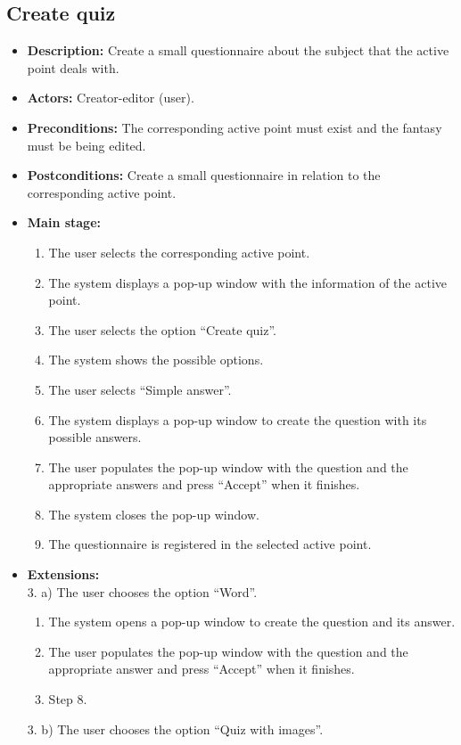 \subsection{Create quiz}
\begin{itemize}
	\item \textbf{Description:} Create a small questionnaire about the subject that the active point deals with.
	\item \textbf{Actors:} Creator-editor (user).
	\item \textbf{Preconditions:} The corresponding active point must exist and the fantasy must be being edited.
	\item \textbf{Postconditions:} Create a small questionnaire in relation to the corresponding active point.
	\item \textbf{Main stage:}
	\begin{enumerate}
		\item The user selects the corresponding active point.
		\item The system displays a pop-up window with the information of the active point.
		\item The user selects the option ``Create quiz''.
		\item The system shows the possible options.
		\item The user selects ``Simple answer''.
		\item The system displays a pop-up window to create the question with its possible answers.
		\item The user populates the pop-up window with the question and the appropriate answers and press ``Accept'' when it finishes.
		\item The system closes the pop-up window.
		\item The questionnaire is registered in the selected active point.
	\end{enumerate}
	\item \textbf{Extensions:} \\3. a) The user chooses the option ``Word''.
	\begin{enumerate}
		\item The system opens a pop-up window to create the question and its answer.
		\item The user populates the pop-up window with the question and the appropriate answer and press ``Accept'' when it finishes.
		\item Step 8.
	\end{enumerate}
	3. b) The user chooses the option ``Quiz with images''.

\end{itemize}
